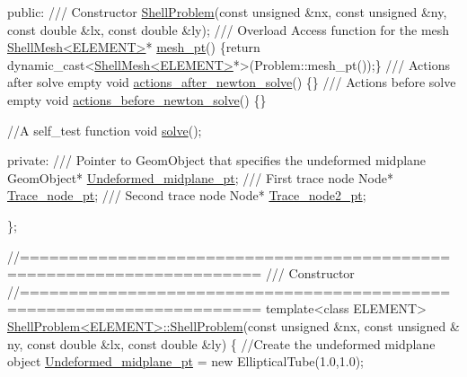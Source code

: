 \begin{DoxyCodeInclude}
\textcolor{keyword}{public}:
\textcolor{comment}{}
\textcolor{comment}{ /// Constructor}
\textcolor{comment}{} \hyperlink{classShellProblem_a1ec644498c95acea00cc05c5bd30d075}{ShellProblem}(\textcolor{keyword}{const} \textcolor{keywordtype}{unsigned} &nx, \textcolor{keyword}{const} \textcolor{keywordtype}{unsigned} &ny, 
              \textcolor{keyword}{const} \textcolor{keywordtype}{double} &lx, \textcolor{keyword}{const} \textcolor{keywordtype}{double} &ly);
\textcolor{comment}{}
\textcolor{comment}{ /// Overload Access function for the mesh}
\textcolor{comment}{} \hyperlink{classShellMesh}{ShellMesh<ELEMENT>}* \hyperlink{classShellProblem_a1905a1b913469ed54f7c8f55d133ff57}{mesh\_pt}() 
  \{\textcolor{keywordflow}{return} \textcolor{keyword}{dynamic\_cast<}\hyperlink{classShellMesh}{ShellMesh<ELEMENT>}*\textcolor{keyword}{>}(Problem::mesh\_pt());\}
\textcolor{comment}{}
\textcolor{comment}{ /// Actions after solve empty}
\textcolor{comment}{} \textcolor{keywordtype}{void} \hyperlink{classShellProblem_a65636b791c99203ecbb09ba2a2eec214}{actions\_after\_newton\_solve}() \{\}
\textcolor{comment}{}
\textcolor{comment}{ /// Actions before solve empty}
\textcolor{comment}{} \textcolor{keywordtype}{void} \hyperlink{classShellProblem_a379156a43ce05fe0e2dcf8a986a2ac64}{actions\_before\_newton\_solve}() \{\}
 
 \textcolor{comment}{//A self\_test function}
 \textcolor{keywordtype}{void} \hyperlink{classShellProblem_aa6d150bd1c137edbf4ded27ed044766d}{solve}();

\textcolor{keyword}{private}:
\textcolor{comment}{}
\textcolor{comment}{ /// Pointer to GeomObject that specifies the undeformed midplane}
\textcolor{comment}{} GeomObject* \hyperlink{classShellProblem_a1c9e4492c7c7c2716fdf8b812ec41651}{Undeformed\_midplane\_pt};
\textcolor{comment}{}
\textcolor{comment}{ /// First trace node}
\textcolor{comment}{} Node* \hyperlink{classShellProblem_a45230216c4791c683218ff6d7f4ba9a0}{Trace\_node\_pt};
\textcolor{comment}{}
\textcolor{comment}{ /// Second trace node}
\textcolor{comment}{} Node* \hyperlink{classShellProblem_a1933abc1b3e5637e23fa2809eb1cd88f}{Trace\_node2\_pt};

\};



\textcolor{comment}{//======================================================================}\textcolor{comment}{}
\textcolor{comment}{/// Constructor}
\textcolor{comment}{}\textcolor{comment}{//======================================================================}
\textcolor{keyword}{template}<\textcolor{keyword}{class} ELEMENT>
\hyperlink{classShellProblem_a1ec644498c95acea00cc05c5bd30d075}{ShellProblem<ELEMENT>::ShellProblem}(\textcolor{keyword}{const} \textcolor{keywordtype}{unsigned} &nx, \textcolor{keyword}{const} \textcolor{keywordtype}{unsigned} &
      ny, 
                                    \textcolor{keyword}{const} \textcolor{keywordtype}{double} &lx, \textcolor{keyword}{const} \textcolor{keywordtype}{double} &ly)
\{
 \textcolor{comment}{//Create the undeformed midplane object}
 \hyperlink{classShellProblem_a1c9e4492c7c7c2716fdf8b812ec41651}{Undeformed\_midplane\_pt} = \textcolor{keyword}{new} EllipticalTube(1.0,1.0);


\end{DoxyCodeInclude}

